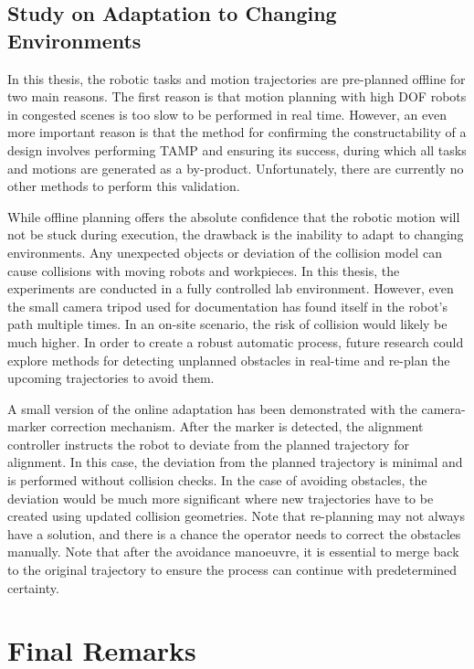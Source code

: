 \subsection{Study on Adaptation to Changing Environments}

In this thesis, the robotic tasks and motion trajectories are pre-planned offline for two main reasons. The first reason is that motion planning with high DOF robots in congested scenes is too slow to be performed in real time. However, an even more important reason is that the method for confirming the constructability of a design involves performing TAMP and ensuring its success, during which all tasks and motions are generated as a by-product. Unfortunately, there are currently no other methods to perform this validation. 

While offline planning offers the absolute confidence that the robotic motion will not be stuck during execution, the drawback is the inability to adapt to changing environments. Any unexpected objects or deviation of the collision model can cause collisions with moving robots and workpieces. In this thesis, the experiments are conducted in a fully controlled lab environment. However, even the small camera tripod used for documentation has found itself in the robot's path multiple times. In an on-site scenario, the risk of collision would likely be much higher. In order to create a robust automatic process, future research could explore methods for detecting unplanned obstacles in real-time and re-plan the upcoming trajectories to avoid them.

A small version of the online adaptation has been demonstrated with the camera-marker correction mechanism. After the marker is detected, the alignment controller instructs the robot to deviate from the planned trajectory for alignment. In this case, the deviation from the planned trajectory is minimal and is performed without collision checks. In the case of avoiding obstacles, the deviation would be much more significant where new trajectories have to be created using updated collision geometries. Note that re-planning may not always have a solution, and there is a chance the operator needs to correct the obstacles manually. Note that after the avoidance manoeuvre, it is essential to merge back to the original trajectory to ensure the process can continue with predetermined certainty.

\section{Final Remarks}

